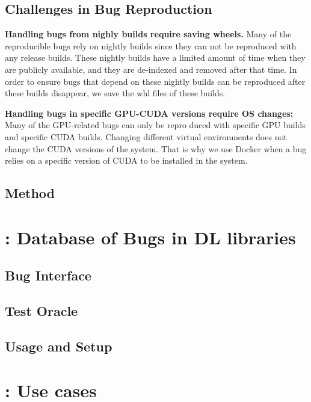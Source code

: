 \documentclass[sigconf]{acmart}
\begin{document}

\subsection{Challenges in Bug Reproduction}

\textbf{Handling bugs from nighly builds require saving wheels.}  Many
of the reproducible bugs rely on nightly builds since they can not be
reproduced with any release builds. These nightly builds have a
limited amount of time when they are publicly available, and they are
de-indexed and removed after that time. In order to ensure bugs that
depend on these nightly builds can be reproduced after these builds
disappear, we save the whl files of these builds.

\textbf{Handling bugs in specific GPU-CUDA versions require OS
  changes:} Many of the GPU-related bugs can only be repro duced with
specific GPU builds and specific CUDA builds. Changing different
virtual environments does not change the CUDA versions of the
system. That is why we use Docker when a bug relies on a specific
version of CUDA to be installed in the system.

\subsection{Method}



\section{\tname: Database of Bugs in DL libraries}
\subsection{Bug Interface}
\subsection{Test Oracle}
\subsection{Usage and Setup}

\section{\tname: Use cases}
\end{document}
